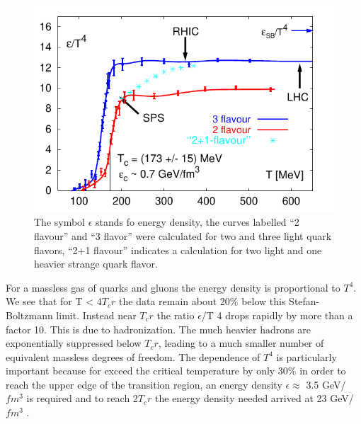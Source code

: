 \documentclass[12pt,a4paper]{book}
\begin{document}
	\begin{figure}[ht]
		\centering
		\includegraphics[width=0.7\linewidth]{pictures/deconfinement.png}
		\caption{The symbol $\epsilon$ stands fo energy density, the curves labelled “2 flavour” and “3 flavor” were calculated for two and three light quark flavors, “2+1 flavour” indicates a calculation for two light and one heavier strange quark flavor.}
		\label{fig:deconfinement} 
	\end{figure}
	For a massless gas of quarks and gluons the energy density is proportional to $T^4$.  We see that for T < 4$T_cr$ the data remain about 20\% below this Stefan-Boltzmann	limit. Instead near $T_cr$ the ratio $\epsilon$/T 4 drops rapidly by more than a factor 10. This is due to hadronization. The much heavier hadrons are exponentially suppressed below $T_cr$, leading to a much smaller number of equivalent massless degrees of freedom. The dependence of $T^4$ is particularly important because for exceed the critical temperature by only 30\% in order to reach the upper edge of the transition region, an energy density $\epsilon \approx$  3.5 GeV/$fm^3$ is required and to reach 2$T_cr$ the energy density needed arrived at 23 GeV/$fm^3$ \cite{heinz2004conceptsheavyionphysics}.
	
\end{document}
